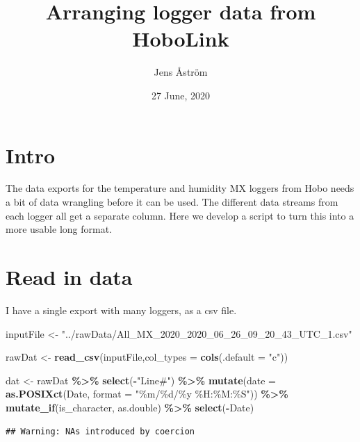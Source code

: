 \documentclass[]{article}
\title{Arranging logger data from HoboLink}
\author{Jens Åström}
\date{27 June, 2020}
\newenvironment{Shaded}{\begin{snugshade}}{\end{snugshade}}
\newcommand{\DataTypeTok}[1]{\textcolor[rgb]{0.13,0.29,0.53}{#1}}
\newcommand{\KeywordTok}[1]{\textcolor[rgb]{0.13,0.29,0.53}{\textbf{#1}}}
\newcommand{\NormalTok}[1]{#1}
\newcommand{\OperatorTok}[1]{\textcolor[rgb]{0.81,0.36,0.00}{\textbf{#1}}}
\newcommand{\StringTok}[1]{\textcolor[rgb]{0.31,0.60,0.02}{#1}}
\begin{document}
\maketitle

{
\setcounter{tocdepth}{2}
\tableofcontents
}
\hypertarget{intro}{%
\section{Intro}\label{intro}}

The data exports for the temperature and humidity MX loggers from Hobo
needs a bit of data wrangling before it can be used. The different data
streams from each logger all get a separate column. Here we develop a
script to turn this into a more usable long format.

\hypertarget{read-in-data}{%
\section{Read in data}\label{read-in-data}}

I have a single export with many loggers, as a csv file.

\begin{Shaded}
\begin{Highlighting}[]
\NormalTok{inputFile <{-}}\StringTok{ "../rawData/All\_MX\_2020\_2020\_06\_26\_09\_20\_43\_UTC\_1.csv"}

\NormalTok{rawDat <{-}}\StringTok{ }\KeywordTok{read\_csv}\NormalTok{(inputFile,}\DataTypeTok{col\_types =} \KeywordTok{cols}\NormalTok{(}\DataTypeTok{.default =} \StringTok{"c"}\NormalTok{))}

\NormalTok{dat <{-}}\StringTok{ }\NormalTok{rawDat }\OperatorTok{\%>\%}\StringTok{  }
\StringTok{  }\KeywordTok{select}\NormalTok{(}\OperatorTok{{-}}\StringTok{"Line\#"}\NormalTok{) }\OperatorTok{\%>\%}\StringTok{ }
\StringTok{  }\KeywordTok{mutate}\NormalTok{(}\DataTypeTok{date =} \KeywordTok{as.POSIXct}\NormalTok{(Date, }\DataTypeTok{format =} \StringTok{"\%m/\%d/\%y \%H:\%M:\%S"}\NormalTok{)) }\OperatorTok{\%>\%}\StringTok{ }
\StringTok{  }\KeywordTok{mutate\_if}\NormalTok{(is\_character, as.double) }\OperatorTok{\%>\%}\StringTok{ }
\StringTok{  }\KeywordTok{select}\NormalTok{(}\OperatorTok{{-}}\NormalTok{Date)}
\end{Highlighting}
\end{Shaded}

\begin{verbatim}
## Warning: NAs introduced by coercion
\end{verbatim}
\end{document}
